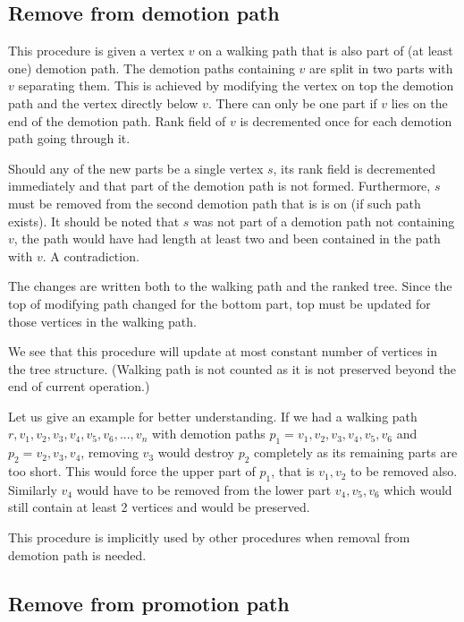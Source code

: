 \subsection{Remove from demotion path}

This procedure is given a vertex $v$ on a walking path that is also part of (at least one) demotion path. The demotion paths containing $v$ are split in two parts with $v$ separating them. This is achieved by modifying the vertex on top the demotion path and the vertex directly below $v$. There can only be one part if $v$ lies on the end of the demotion path. Rank field of $v$ is decremented once for each demotion path going through it. 

Should any of the new parts be a single vertex $s$, its rank field is decremented immediately and that part of the demotion path is not formed. Furthermore, $s$ must be removed from the second demotion path that is is on (if such path exists). It should be noted that $s$ was not part of a demotion path not containing $v$, the path would have had length at least two and been contained in the path with $v$. A contradiction. 

The changes are written both to the walking path and the ranked tree. Since the top of modifying path changed for the bottom part, top must be updated for those vertices in the walking path.

We see that this procedure will update at most constant number of vertices in the tree structure. (Walking path is not counted as it is not preserved beyond the end of current operation.)

Let us give an example for better understanding. If we had a walking path $r,v_1,v_2,v_3,v_4,v_5,v_6,...,v_n$ with demotion paths $p_1 = v_1,v_2,v_3,v_4,v_5,v_6$ and $p_2 = v_2,v_3,v_4$, removing $v_3$ would destroy $p_2$ completely as its remaining parts are too short. This would force the upper part of $p_1$, that is $v_1,v_2$ to be removed also. Similarly $v_4$ would have to be removed from the lower part $v_4,v_5,v_6$ which would still contain at least 2 vertices and would be preserved.

This procedure is implicitly used by other procedures when removal from demotion path is needed.


\subsection{Remove from promotion path}

